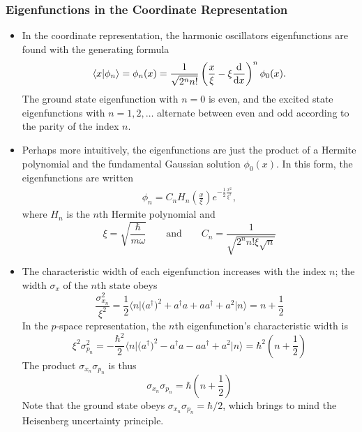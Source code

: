 \documentclass[11pt, a4paper]{article}
\newcommand{\eqtext}[1]{\qquad \text{#1} \qquad}
\newcommand{\bmel}[3]{\big \langle {#1} \big | {#2} \big | {#3} \big \rangle}  %
\begin{document}
\subsubsection{Eigenfunctions in the Coordinate Representation}
\begin{itemize}
	\item In the coordinate representation, the harmonic oscillators eigenfunctions are found with the generating formula
	\begin{equation*}
		\braket{x}{\phi_{n}} = \phi_{n}(x) = \frac{1}{\sqrt{2^{n}n!}}\left(\frac{x}{\xi} - \xi \dv{x}\right)^{n}\phi_{0}(x).
	\end{equation*}
	The ground state eigenfunction with $ n = 0 $ is even, and the excited state eigenfunctions with $ n = 1, 2, \ldots $ alternate between even and odd according to the parity of the index $ n $. 
	
	\item Perhaps more intuitively, the eigenfunctions are just the product of a Hermite polynomial and the fundamental Gaussian solution $ \phi_{0}(x) $. In this form, the eigenfunctions are written
	\begin{align*}
		\phi_{n} = C_{n} H_{n}\left(\frac{x}{\xi}\right)e^{-\frac{1}{2}\frac{x^{2}}{\xi^{2}}},
	\end{align*}
	where $ H_{n} $ is the $ n $th Hermite polynomial and
	\begin{equation*}
		\xi = \sqrt{\frac{\hbar}{m \omega}} \eqtext{and} C_{n} = \frac{1}{\sqrt{2^{n}n!\xi \sqrt{n}}}
	\end{equation*}
	
	\item The characteristic width of each eigenfunction increases with the index $ n $; the width $ \sigma_{x} $ of the $ n $th state obeys
	\begin{equation*}
		\frac{\sigma_{x_{n}}^{2}}{\xi^{2}} = \frac{1}{2}\bmel{n}{\big(a^{\dagger}\big)^{2} + a^{\dagger}a + aa^{\dagger} + a^{2}}{n} = n + \frac{1}{2}
	\end{equation*}
	In the $ p $-space representation, the $ n $th eigenfunction's characteristic width is
	\begin{equation*}
		\xi^{2} \sigma_{p_{n}}^{2} = - \frac{\hbar^{2}}{2}\bmel{n}{\big(a^{\dagger}\big)^{2} - a^{\dagger}a - aa^{\dagger} + a^{2}}{n} = \hbar^{2}\left(n + \frac{1}{2}\right)
	\end{equation*}
	The product $ \sigma_{x_{n}}\sigma_{p_{n}} $ is thus
	\begin{equation*}
		\sigma_{x_{n}}\sigma_{p_{n}} = \hbar\left(n + \frac{1}{2}\right)
	\end{equation*}
	Note that the ground state obeys $ \sigma_{x_{n}}\sigma_{p_{n}} = \hbar/2 $, which brings to mind the Heisenberg uncertainty principle.
	
	
\end{itemize}
\end{document}
